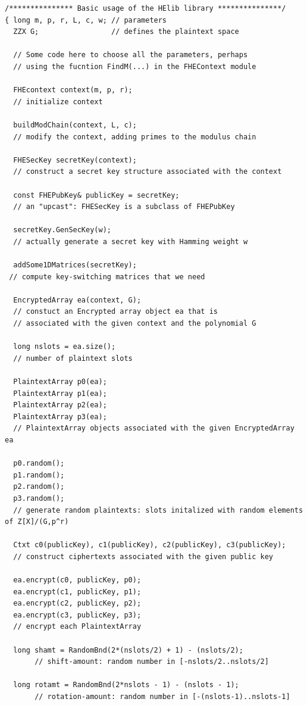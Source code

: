 \documentclass[14pt]{extarticle}
\begin{document}
\begin{small}
\noindent
\begin{verbatim}
/*************** Basic usage of the HElib library ***************/
{ long m, p, r, L, c, w; // parameters
  ZZX G;                 // defines the plaintext space

  // Some code here to choose all the parameters, perhaps
  // using the fucntion FindM(...) in the FHEContext module

  FHEcontext context(m, p, r);
  // initialize context

  buildModChain(context, L, c);
  // modify the context, adding primes to the modulus chain

  FHESecKey secretKey(context);
  // construct a secret key structure associated with the context

  const FHEPubKey& publicKey = secretKey;
  // an "upcast": FHESecKey is a subclass of FHEPubKey

  secretKey.GenSecKey(w); 
  // actually generate a secret key with Hamming weight w

  addSome1DMatrices(secretKey); 
 // compute key-switching matrices that we need

  EncryptedArray ea(context, G);
  // constuct an Encrypted array object ea that is
  // associated with the given context and the polynomial G

  long nslots = ea.size();
  // number of plaintext slots

  PlaintextArray p0(ea);
  PlaintextArray p1(ea);
  PlaintextArray p2(ea);
  PlaintextArray p3(ea);
  // PlaintextArray objects associated with the given EncryptedArray ea

  p0.random();
  p1.random();
  p2.random();
  p3.random();
  // generate random plaintexts: slots initalized with random elements of Z[X]/(G,p^r)

  Ctxt c0(publicKey), c1(publicKey), c2(publicKey), c3(publicKey);
  // construct ciphertexts associated with the given public key

  ea.encrypt(c0, publicKey, p0);
  ea.encrypt(c1, publicKey, p1);
  ea.encrypt(c2, publicKey, p2);
  ea.encrypt(c3, publicKey, p3);
  // encrypt each PlaintextArray

  long shamt = RandomBnd(2*(nslots/2) + 1) - (nslots/2);
       // shift-amount: random number in [-nslots/2..nslots/2]

  long rotamt = RandomBnd(2*nslots - 1) - (nslots - 1);
       // rotation-amount: random number in [-(nslots-1)..nslots-1]


\end{verbatim}
\end{small}
\end{document}
